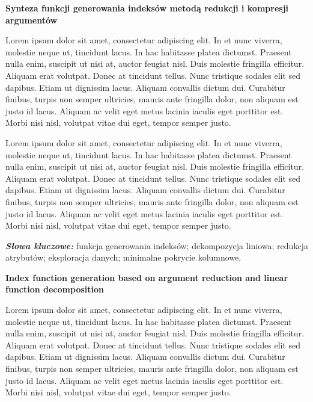 \newpage
\vspace{10cm}

\newpage
\begin{center}
	\textbf{Synteza funkcji generowania indeksów metodą redukcji i kompresji argumentów}
\end{center}

Lorem ipsum dolor sit amet, consectetur adipiscing elit. In et nunc viverra, molestie neque ut, tincidunt lacus. In hac habitasse platea dictumst. Praesent nulla enim, suscipit ut nisi at, auctor feugiat nisl. Duis molestie fringilla efficitur. Aliquam erat volutpat. Donec at tincidunt tellus. Nunc tristique sodales elit sed dapibus. Etiam ut dignissim lacus. Aliquam convallis dictum dui. Curabitur finibus, turpis non semper ultricies, mauris ante fringilla dolor, non aliquam est justo id lacus. Aliquam ac velit eget metus lacinia iaculis eget porttitor est. Morbi nisi nisl, volutpat vitae dui eget, tempor semper justo.

Lorem ipsum dolor sit amet, consectetur adipiscing elit. In et nunc viverra, molestie neque ut, tincidunt lacus. In hac habitasse platea dictumst. Praesent nulla enim, suscipit ut nisi at, auctor feugiat nisl. Duis molestie fringilla efficitur. Aliquam erat volutpat. Donec at tincidunt tellus. Nunc tristique sodales elit sed dapibus. Etiam ut dignissim lacus. Aliquam convallis dictum dui. Curabitur finibus, turpis non semper ultricies, mauris ante fringilla dolor, non aliquam est justo id lacus. Aliquam ac velit eget metus lacinia iaculis eget porttitor est. Morbi nisi nisl, volutpat vitae dui eget, tempor semper justo.

\textit{\textbf{Słowa kluczowe:}} funkcja generowania indeksów; dekompozycja liniowa; redukcja atrybutów; eksploracja danych; minimalne pokrycie kolumnowe.

	\vspace{1cm}
\newpage %

\begin{center}
    \textbf{Index function generation based on argument reduction and linear function decomposition}
\end{center}

Lorem ipsum dolor sit amet, consectetur adipiscing elit. In et nunc viverra, molestie neque ut, tincidunt lacus. In hac habitasse platea dictumst. Praesent nulla enim, suscipit ut nisi at, auctor feugiat nisl. Duis molestie fringilla efficitur. Aliquam erat volutpat. Donec at tincidunt tellus. Nunc tristique sodales elit sed dapibus. Etiam ut dignissim lacus. Aliquam convallis dictum dui. Curabitur finibus, turpis non semper ultricies, mauris ante fringilla dolor, non aliquam est justo id lacus. Aliquam ac velit eget metus lacinia iaculis eget porttitor est. Morbi nisi nisl, volutpat vitae dui eget, tempor semper justo.

